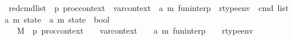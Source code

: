 \begin{isabellebody}
\isamarkupfalse%
\ red{\isacharunderscore}{\kern0pt}cmd{\isacharunderscore}{\kern0pt}list\ {\isacharcolon}{\kern0pt}{\isacharcolon}{\kern0pt}\ {\isachardoublequoteopen}{\isacharprime}{\kern0pt}p\ proc{\isacharunderscore}{\kern0pt}context\ {\isasymRightarrow}\ var{\isacharunderscore}{\kern0pt}context\ {\isasymRightarrow}\ {\isacharparenleft}{\kern0pt}{\isacharprime}{\kern0pt}a{\isacharcomma}{\kern0pt}\ {\isacharprime}{\kern0pt}m{\isacharparenright}{\kern0pt}\ fun{\isacharunderscore}{\kern0pt}interp\ {\isasymRightarrow}\ rtype{\isacharunderscore}{\kern0pt}env\ {\isasymRightarrow}\ cmd\ list\ {\isasymRightarrow}\ {\isacharparenleft}{\kern0pt}{\isacharprime}{\kern0pt}a{\isacharcomma}{\kern0pt}\ {\isacharprime}{\kern0pt}m{\isacharparenright}{\kern0pt}\ state\ {\isasymRightarrow}\ {\isacharparenleft}{\kern0pt}{\isacharprime}{\kern0pt}a{\isacharcomma}{\kern0pt}\ {\isacharprime}{\kern0pt}m{\isacharparenright}{\kern0pt}\ state\ {\isasymRightarrow}\ bool{\isachardoublequoteclose}\isanewline
\ \ {\isacharparenleft}{\kern0pt}{\isachardoublequoteopen}{\isacharunderscore}{\kern0pt}{\isacharcomma}{\kern0pt}{\isacharunderscore}{\kern0pt}{\isacharcomma}{\kern0pt}{\isacharunderscore}{\kern0pt}{\isacharcomma}{\kern0pt}{\isacharunderscore}{\kern0pt}\ {\isasymturnstile}\ {\isacharparenleft}{\kern0pt}{\isacharparenleft}{\kern0pt}{\isasymlangle}{\isacharunderscore}{\kern0pt}{\isacharcomma}{\kern0pt}{\isacharunderscore}{\kern0pt}{\isasymrangle}{\isacharparenright}{\kern0pt}\ {\isacharbrackleft}{\kern0pt}{\isasymrightarrow}{\isacharbrackright}{\kern0pt}{\isacharslash}{\kern0pt}\ {\isacharunderscore}{\kern0pt}{\isacharparenright}{\kern0pt}{\isachardoublequoteclose}\ {\isacharbrackleft}{\kern0pt}{}{}{\isacharcomma}{\kern0pt}{}{\isacharcomma}{\kern0pt}{}{\isacharcomma}{\kern0pt}{}{\isacharbrackright}{\kern0pt}\ {}{}{\isacharparenright}{\kern0pt}\isanewline
\ \ \ M\ {\isacharcolon}{\kern0pt}{\isacharcolon}{\kern0pt}\ {\isachardoublequoteopen}{\isacharprime}{\kern0pt}p\ proc{\isacharunderscore}{\kern0pt}context{\isachardoublequoteclose}\ \ {\isasymLambda}\ {\isacharcolon}{\kern0pt}{\isacharcolon}{\kern0pt}\ var{\isacharunderscore}{\kern0pt}context\ \ {\isasymGamma}\ {\isacharcolon}{\kern0pt}{\isacharcolon}{\kern0pt}\ {\isachardoublequoteopen}{\isacharparenleft}{\kern0pt}{\isacharprime}{\kern0pt}a{\isacharcomma}{\kern0pt}\ {\isacharprime}{\kern0pt}m{\isacharparenright}{\kern0pt}\ fun{\isacharunderscore}{\kern0pt}interp{\isachardoublequoteclose}\ \ {\isasymOmega}\ {\isacharcolon}{\kern0pt}{\isacharcolon}{\kern0pt}\ rtype{\isacharunderscore}{\kern0pt}env\isanewline

\end{isabellebody}
